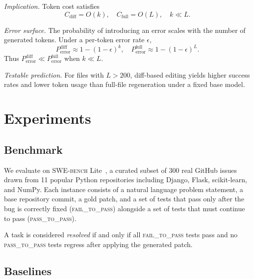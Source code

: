 \documentclass[journal]{IEEEtran}
\newcommand{\swebench}{\textsc{SWE-bench}}
\begin{document}
\textit{Implication.}
Token cost satisfies
\begin{equation}
C_{\text{diff}} = O(k), \quad C_{\text{full}} = O(L), \quad k \ll L.
\end{equation}

\textit{Error surface.}
The probability of introducing an error scales with the number of generated tokens. Under a per-token error rate $\epsilon$,
\begin{equation}
P_{\text{error}}^{\text{diff}} \approx 1 - (1 - \epsilon)^k, \quad
P_{\text{error}}^{\text{full}} \approx 1 - (1 - \epsilon)^L.
\end{equation}
Thus $P_{\text{error}}^{\text{diff}} \ll P_{\text{error}}^{\text{full}}$ when $k \ll L$.

\textit{Testable prediction.}
For files with $L > 200$, diff-based editing yields higher success rates and lower token usage than full-file regeneration under a fixed base model.


\section{Experiments}
\label{sec:experiments}

\subsection{Benchmark}

We evaluate on \swebench{} Lite~\cite{jimenez2024swebench}, a curated subset of 300 real GitHub issues drawn from 11 popular Python repositories including Django, Flask, scikit-learn, and NumPy. Each instance consists of a natural language problem statement, a base repository commit, a gold patch, and a set of tests that pass only after the bug is correctly fixed (\textsc{fail\_to\_pass}) alongside a set of tests that must continue to pass (\textsc{pass\_to\_pass}).

A task is considered \textit{resolved} if and only if all \textsc{fail\_to\_pass} tests pass and no \textsc{pass\_to\_pass} tests regress after applying the generated patch.

\subsection{Baselines}
\end{document}

